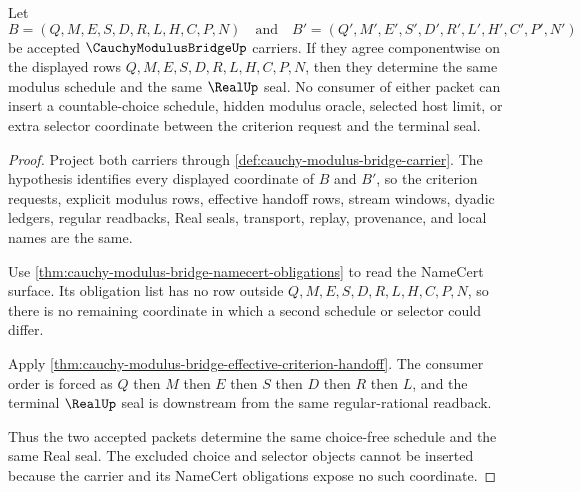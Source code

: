 \begin{theorem}
\label{thm:cauchy-modulus-bridge-choice-free-schedule}
Let
$$
B=(Q,M,E,S,D,R,L,H,C,P,N)
\quad\text{and}\quad
B'=(Q',M',E',S',D',R',L',H',C',P',N')
$$
be accepted $\CauchyModulusBridgeUp$ carriers. If they agree componentwise on the displayed rows $Q,M,E,S,D,R,L,H,C,P,N$, then they determine the same modulus schedule and the same $\RealUp$ seal. No consumer of either packet can insert a countable-choice schedule, hidden modulus oracle, selected host limit, or extra selector coordinate between the criterion request and the terminal seal.
\end{theorem}
\begin{proof}
Project both carriers through \autoref{def:cauchy-modulus-bridge-carrier}. The hypothesis identifies every displayed coordinate of $B$ and $B'$, so the criterion requests, explicit modulus rows, effective handoff rows, stream windows, dyadic ledgers, regular readbacks, Real seals, transport, replay, provenance, and local names are the same.

Use \autoref{thm:cauchy-modulus-bridge-namecert-obligations} to read the NameCert surface. Its obligation list has no row outside $Q,M,E,S,D,R,L,H,C,P,N$, so there is no remaining coordinate in which a second schedule or selector could differ.

Apply \autoref{thm:cauchy-modulus-bridge-effective-criterion-handoff}. The consumer order is forced as $Q$ then $M$ then $E$ then $S$ then $D$ then $R$ then $L$, and the terminal $\RealUp$ seal is downstream from the same regular-rational readback.

Thus the two accepted packets determine the same choice-free schedule and the same Real seal. The excluded choice and selector objects cannot be inserted because the carrier and its NameCert obligations expose no such coordinate.
\end{proof}


